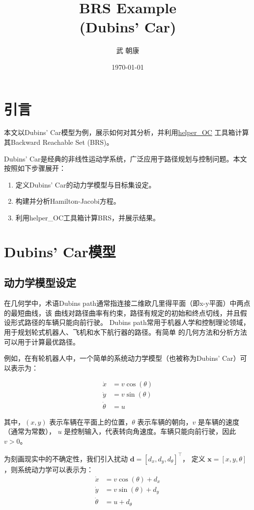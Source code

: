 \documentclass[11pt]{ctexrep}
\title{BRS Example\\(Dubins' Car)}
\author{武 朝康}
\date{\today}
\begin{document}
\maketitle
\section{引言}
本文以Dubins' Car模型为例，展示如何对其分析，并利用\href{https://github.com/HJReachability/helperOC}{helper\_OC}
工具箱计算其Backward Reachable Set (BRS)。 

Dubins' Car是经典的非线性运动学系统，广泛应用于路径规划与控制问题。本文按照如下步骤展开：
\begin{enumerate}
    \item 定义Dubins' Car的动力学模型与目标集设定。
    \item 构建并分析Hamilton-Jacobi方程。
    \item 利用helper\_OC工具箱计算BRS，并展示结果。
 \end{enumerate}

\section{Dubins' Car模型}
\subsection{动力学模型设定}
在几何学中，术语Dubins path通常指连接二维欧几里得平面（即x-y平面）中两点的最短曲线，该
曲线对路径曲率有约束，路径有规定的初始和终点切线，并且假设形式路径的车辆只能向前行驶。
Dubins path常用于机器人学和控制理论领域，用于规划轮式机器人、飞机和水下航行器的路径。有简单
的几何方法和分析方法可以用于计算最优路径。

例如，在有轮机器人中，一个简单的系统动力学模型（也被称为Dubins' Car）可以表示为：

\begin{equation}
\begin{aligned}
\dot{x} &= v \cos(\theta) \\
\dot{y} &= v \sin(\theta) \\
\dot{\theta} &= u
\end{aligned}
\end{equation}

其中，$(x, y)$ 表示车辆在平面上的位置，$\theta$ 表示车辆的朝向，$v$ 是车辆的速度（通常为常数），
$u$ 是控制输入，代表转向角速度。车辆只能向前行驶，因此 $v > 0$。

为刻画现实中的不确定性，我们引入扰动 $\mathbf{d} = [d_x,d_y,d_{\theta}]^\top$，
定义 $\mathbf{x} = [x,y,\theta]$，则系统动力学可以表示为：
\begin{equation}
\begin{aligned}
\dot{x} &= v \cos(\theta) + d_x \\
\dot{y} &= v \sin(\theta) + d_y \\
\dot{\theta} &= u + d_{\theta}
\end{aligned}
\end{equation}
\end{document}
